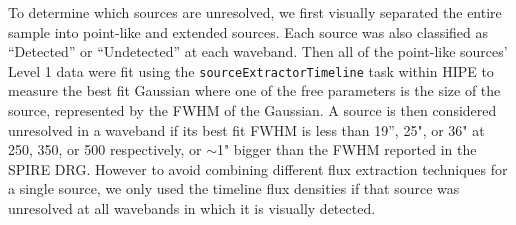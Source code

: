To determine which sources are unresolved, we first visually separated the entire sample into point-like and extended sources. Each source was also classified as ``Detected'' or ``Undetected'' at each waveband. Then all of the point-like sources' Level 1 data were fit using the \texttt{sourceExtractorTimeline} task within HIPE to measure the best fit Gaussian where one of the free parameters is the size of the source, represented by the FWHM of the Gaussian. A source is then considered unresolved in a waveband if its best fit FWHM is less than 19'', 25", or 36" at 250, 350, or 500 \micron{} respectively, or $\sim$1" bigger than the FWHM reported in the SPIRE DRG. However to avoid combining different flux extraction techniques for a single source, we only used the timeline flux densities if that source was unresolved at all wavebands in which it is visually detected.